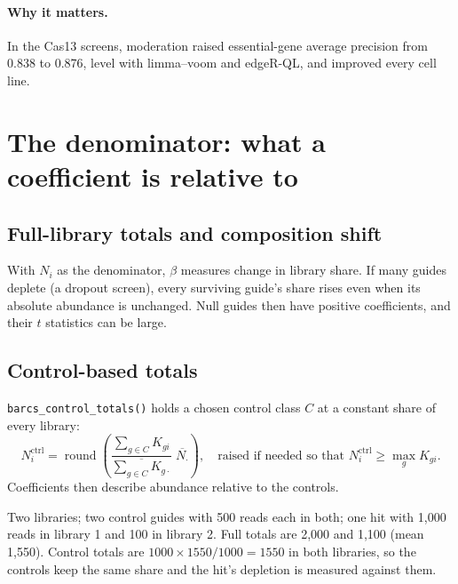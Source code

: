 \documentclass[11pt]{article}
\begin{document}
\paragraph{Why it matters.} In the Cas13 screens, moderation raised
essential-gene average precision from 0.838 to 0.876, level with limma--voom
and edgeR-QL, and improved every cell line.

\section{The denominator: what a coefficient is relative to}

\subsection{Full-library totals and composition shift}

With $N_i$ as the denominator, $\beta$ measures change in library share.  If
many guides deplete (a dropout screen), every surviving guide's share rises
even when its absolute abundance is unchanged.  Null guides then have
positive coefficients, and their $t$ statistics can be large.

\subsection{Control-based totals}

\texttt{barcs\_control\_totals()} holds a chosen control class $C$ at a
constant share of every library:
\begin{equation}
N_i^{\text{ctrl}}=\operatorname{round}\!\left(
\frac{\sum_{g\in C}K_{gi}}{\overline{\sum_{g\in C}K_{g\cdot}}}\;
\overline{N_\cdot}\right),
\quad\text{raised if needed so that } N_i^{\text{ctrl}}\ge\max_g K_{gi}.
\end{equation}
Coefficients then describe abundance relative to the controls.

\begin{example}
Two libraries; two control guides with 500 reads each in both; one hit with
1,000 reads in library 1 and 100 in library 2.  Full totals are 2,000 and
1,100 (mean 1,550).  Control totals are $1000\times1550/1000=1550$ in both
libraries, so the controls keep the same share and the hit's depletion is
measured against them.
\end{example}
\end{document}
